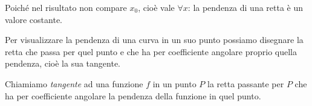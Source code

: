 \vspace{1em}
Poiché nel risultato non compare \(x_0\), 
cioè vale \(\forall x\): la pendenza di una retta è un valore costante.


Per visualizzare la pendenza di una curva in un suo punto 
possiamo disegnare la retta che passa per quel punto e che ha per 
coefficiente angolare proprio quella pendenza, cioè la sua tangente.

\begin{definizione}
Chiamiamo \emph{tangente} ad una funzione \(f\) in un punto \(P\) la retta 
passante per \(P\) che ha per coefficiente angolare la pendenza della 
funzione in quel punto.
\end{definizione}


